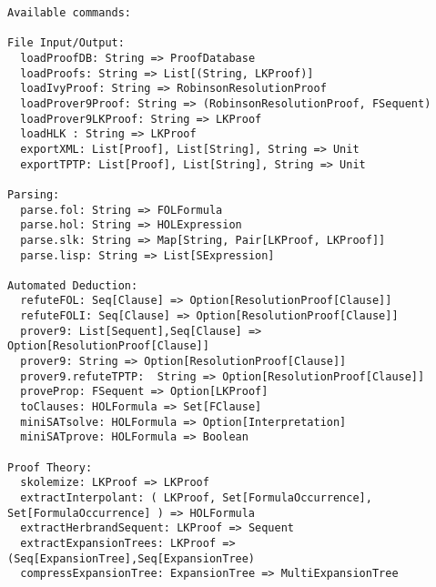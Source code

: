 \documentclass[a4paper, 11pt]{report}
\begin{document}
\begin{lstlisting}
Available commands:

File Input/Output:                                                                                                          
  loadProofDB: String => ProofDatabase
  loadProofs: String => List[(String, LKProof)]
  loadIvyProof: String => RobinsonResolutionProof
  loadProver9Proof: String => (RobinsonResolutionProof, FSequent)
  loadProver9LKProof: String => LKProof
  loadHLK : String => LKProof
  exportXML: List[Proof], List[String], String => Unit                                                                      
  exportTPTP: List[Proof], List[String], String => Unit                                                                     
                                                                                                                            
Parsing:                                                                                                                    
  parse.fol: String => FOLFormula
  parse.hol: String => HOLExpression                                                                                        
  parse.slk: String => Map[String, Pair[LKProof, LKProof]]                                                                  
  parse.lisp: String => List[SExpression]                                                                                   
                                                                                                                            
Automated Deduction:                                                                                                        
  refuteFOL: Seq[Clause] => Option[ResolutionProof[Clause]]
  refuteFOLI: Seq[Clause] => Option[ResolutionProof[Clause]]
  prover9: List[Sequent],Seq[Clause] => Option[ResolutionProof[Clause]]
  prover9: String => Option[ResolutionProof[Clause]]
  prover9.refuteTPTP:  String => Option[ResolutionProof[Clause]]
  proveProp: FSequent => Option[LKProof]
  toClauses: HOLFormula => Set[FClause]
  miniSATsolve: HOLFormula => Option[Interpretation]
  miniSATprove: HOLFormula => Boolean
                                                                                                                            
Proof Theory:                                                                                                               
  skolemize: LKProof => LKProof
  extractInterpolant: ( LKProof, Set[FormulaOccurrence], Set[FormulaOccurrence] ) => HOLFormula
  extractHerbrandSequent: LKProof => Sequent
  extractExpansionTrees: LKProof => (Seq[ExpansionTree],Seq[ExpansionTree)
  compressExpansionTree: ExpansionTree => MultiExpansionTree


\end{lstlisting}
\end{document}
